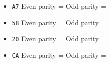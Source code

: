 \begin{itemize}
\item{} {\tt A7} \hskip 30pt Even parity =  \hskip 30pt Odd parity = 
\vskip 5pt
\item{} {\tt 58} \hskip 30pt Even parity =  \hskip 30pt Odd parity = 
\vskip 5pt
\item{} {\tt 20} \hskip 30pt Even parity =  \hskip 30pt Odd parity = 
\vskip 5pt
\item{} {\tt CA} \hskip 30pt Even parity =  \hskip 30pt Odd parity = 
\end{itemize}




